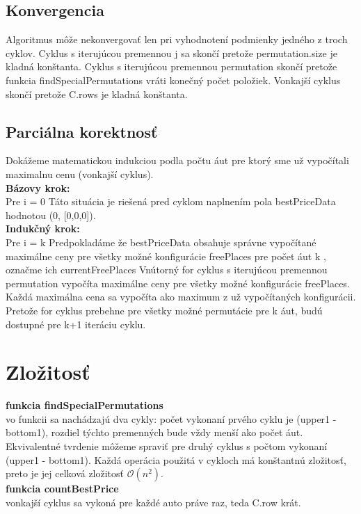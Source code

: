 \documentclass[paper=a4, fontsize=11pt]{scrartcl} %
\numberwithin{equation}{section} %
\numberwithin{figure}{section} %
\numberwithin{table}{section} %
\begin{document}
\subsection*{Konvergencia}
Algoritmus môže nekonvergovať len pri vyhodnotení podmienky jedného z troch cyklov.
Cyklus s iterujúcou premennou j sa skončí pretože permutation.size je kladná konštanta.
Cyklus s iterujúcou premennou permutation skončí pretože funkcia findSpecialPermutations vráti konečný počet položiek.
Vonkajší cyklus skončí pretože C.rows je kladná konštanta.


\subsection*{Parciálna korektnosť}
Dokážeme matematickou indukciou podla počtu áut pre ktorý sme už vypočítali maximalnu cenu (vonkajší cyklus). \ \\

\textbf{Bázovy krok:} \ \\
Pre i = 0
Táto situácia je riešená pred cyklom naplnením pola bestPriceData hodnotou (0, [0,0,0]). \ \\ 

\textbf{Indukčný krok:} \ \\
Pre i = k
Predpokladáme že bestPriceData obsahuje správne vypočítané maximálne ceny pre všetky možné konfigurácie freePlaces pre počet áut k , označme ich currentFreePlaces
Vnútorný for cyklus s iterujúcou premennou permutation vypočíta maximálne ceny pre všetky možné konfigurácie freePlaces. Každá maximálna cena sa vypočíta ako maximum z už vypočítaných konfigurácii.
Pretože for cyklus prebehne pre všetky možné permutácie pre k áut, budú dostupné pre k+1 iteráciu cyklu.

\section{Zložitosť}
\textbf{funkcia findSpecialPermutations} \ \\
vo funkcii sa nachádzajú dva cykly:
počet vykonaní prvého cyklu je (upper1 - bottom1), rozdiel týchto premenných bude vždy menší ako počet áut.
Ekvivalentné tvrdenie môžeme spraviť pre druhý cyklus s počtom vykonaní (upper1 - bottom1).
Každá operácia použitá v cykloch má konštantnú zložitosť, preto je jej celková zložitosť $\mathcal{O}(n^2)$. \ \\

\textbf{funkcia countBestPrice} \ \\
vonkajší cyklus sa vykoná pre každé auto práve raz, teda C.row krát.
\end{document}
